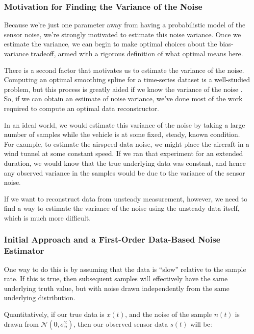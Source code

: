 \documentclass[conf]{new-aiaa}
\begin{document}
    \subsubsection{Motivation for Finding the Variance of the Noise}

    Because we're just one parameter away from having a probabilistic model of the sensor noise, we're strongly motivated to estimate this noise variance. Once we estimate the variance, we can begin to make optimal choices about the bias-variance tradeoff, armed with a rigorous definition of what optimal means here.

    There is a second factor that motivates us to estimate the variance of the noise. Computing an optimal smoothing spline for a time-series dataset is a well-studied problem, but this process is greatly aided if we know the variance of the noise \cite{wahba}. So, if we can obtain an estimate of noise variance, we've done most of the work required to compute an optimal data reconstructor.

    In an ideal world, we would estimate this variance of the noise by taking a large number of samples while the vehicle is at some fixed, steady, known condition. For example, to estimate the airspeed data noise, we might place the aircraft in a wind tunnel at some constant speed. If we ran that experiment for an extended duration, we would know that the true underlying data was constant, and hence any observed variance in the samples would be due to the variance of the sensor noise.

    If we want to reconstruct data from unsteady measurement, however, we need to find a way to estimate the variance of the noise using the unsteady data itself, which is much more difficult.

    \subsubsection{Initial Approach and a First-Order Data-Based Noise Estimator}

    One way to do this is by assuming that the data is ``slow'' relative to the sample rate. If this is true, then subsequent samples will effectively have the same underlying truth value, but with noise drawn independently from the same underlying distribution.

    Quantitatively, if our true data is $x(t)$, and the noise of the sample $n(t)$ is drawn from $\mathcal{N}(0, \sigma^2_n)$, then our observed sensor data $s(t)$ will be:
\end{document}
